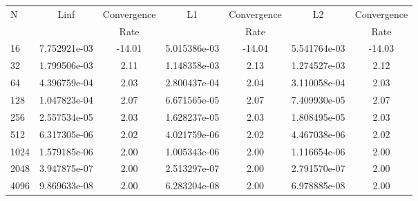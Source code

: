 \documentclass[12pt]{article}
\begin{document}
	\begin{tabular}{l|c|c|c|c|c|c}
		N&Linf&Convergence&L1&Convergence&L2&Convergence\\
		&&Rate&&Rate&&Rate\\
		\hline
		16&7.752921e-03&-14.01&5.015386e-03&-14.04&5.541764e-03&-14.03\\
		\hline
		32&1.799506e-03&2.11&1.148358e-03&2.13&1.274527e-03&2.12\\
		\hline
		64&4.396759e-04&2.03&2.800437e-04&2.04&3.110058e-04&2.03\\
		\hline
		128&1.047823e-04&2.07&6.671565e-05&2.07&7.409930e-05&2.07\\
		\hline
		256&2.557534e-05&2.03&1.628237e-05&2.03&1.808495e-05&2.03\\
		\hline
		512&6.317305e-06&2.02&4.021759e-06&2.02&4.467038e-06&2.02\\
		\hline
		1024&1.579185e-06&2.00&1.005343e-06&2.00&1.116654e-06&2.00\\
		\hline
		2048&3.947875e-07&2.00&2.513297e-07&2.00&2.791570e-07&2.00\\
		\hline
		4096&9.869633e-08&2.00&6.283204e-08&2.00&6.978885e-08&2.00\\
	\end{tabular}
\end{document}
